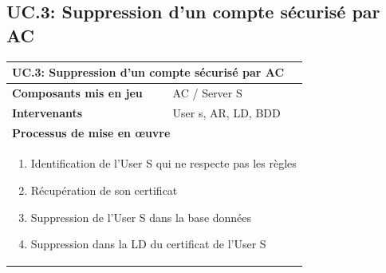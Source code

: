 \documentclass[a4paper,11pt,french]{article}
\begin{document}
\subsection{UC.3: Suppression d'un compte sécurisé par AC}
\begin{center}
	\vspace*{0.7cm}
	\begin{tabularx}{16cm}{|l|X|}
	\hline
	\multicolumn{2}{|l|}{\textbf{UC.3: Suppression d'un compte sécurisé par AC}}\\
	\hline
	\textbf{Composants mis en jeu} & AC / Server S \\
	\hline
	\textbf{Intervenants} & User s, AR, LD, BDD\\
	\hline
	\multicolumn{2}{|l|}{\textbf{Processus de mise en \oe uvre}}\\
	\hline
	\multicolumn{2}{|p{15cm}|}{\begin{enumerate}\item Identification de l'User S qui ne respecte pas les règles \item Récupération de son certificat \item Suppression de l'User S dans la base données \item Suppression dans la LD du certificat de l'User S \end{enumerate}}\\
	\hline
	\end{tabularx}
\end{center}
\end{document}
